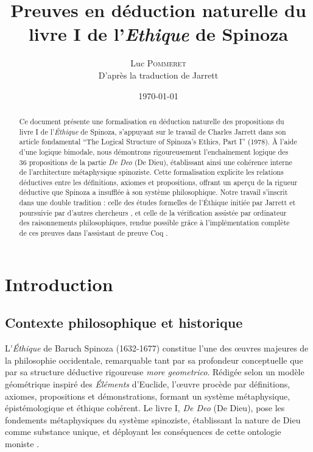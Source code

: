 \documentclass[10pt,a3paper]{article}
\title{Preuves en déduction naturelle du livre I de l'\textit{Ethique} de Spinoza}
\author{Luc \textsc{Pommeret} \\ D'après la traduction de Jarrett}
\date{\today}
\begin{document}
\maketitle

\begin{abstract}
Ce document présente une formalisation en déduction naturelle \cite{rougemont} des propositions du livre I de l'\textit{Éthique} de Spinoza, s'appuyant sur le travail de Charles Jarrett \cite{jarrett1978logical} dans son article fondamental ``The Logical Structure of Spinoza's Ethics, Part I'' (1978). À l'aide d'une logique bimodale, nous démontrons rigoureusement l'enchaînement logique des 36 propositions de la partie \textit{De Deo} (De Dieu), établissant ainsi une cohérence interne de l'architecture métaphysique spinoziste. Cette formalisation explicite les relations déductives entre les définitions, axiomes et propositions, offrant un aperçu de la rigueur déductive que Spinoza a insufflée à son système philosophique. Notre travail s'inscrit dans une double tradition : celle des études formelles de l'Éthique initiée par Jarrett et poursuivie par d'autres chercheurs \cite{gueroult1968spinoza, bennett1984study}, et celle de la vérification assistée par ordinateur des raisonnements philosophiques, rendue possible grâce à l'implémentation complète de ces preuves dans l'assistant de preuve Coq \cite{pommeret2025github}.
\end{abstract}

\tableofcontents

\section{Introduction}

\subsection{Contexte philosophique et historique}

L'\textit{Éthique} de Baruch Spinoza (1632-1677) constitue l'une des œuvres majeures de la philosophie occidentale, remarquable tant par sa profondeur conceptuelle que par sa structure déductive rigoureuse \textit{more geometrico}. Rédigée selon un modèle géométrique inspiré des \textit{Éléments} d'Euclide, l'œuvre procède par définitions, axiomes, propositions et démonstrations, formant un système métaphysique, épistémologique et éthique cohérent. Le livre I, \textit{De Deo} (De Dieu), pose les fondements métaphysiques du système spinoziste, établissant la nature de Dieu comme substance unique, et déployant les conséquences de cette ontologie moniste \cite{spinoza1965ethique}.
\end{document}

